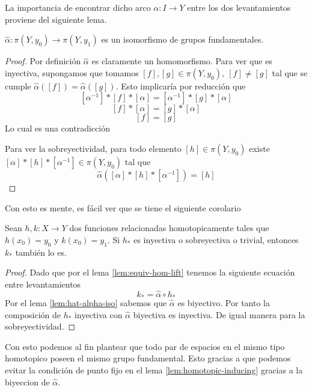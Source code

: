 La importancia de encontrar dicho arco \(\alpha : I \to Y\) entre los
dos levantamientos proviene del siguiente lema.
\begin{lema} \label{lem:hat-alpha-iso}
\(\hat \alpha : \pi (Y, y_0) \to \pi (Y, y_1)\) es un isomorfismo de
grupos fundamentales.
\end{lema}
\begin{proof}
  Por definición \(\hat \alpha\) es claramente un homomorfismo. Para ver
  que es inyectiva, supongamos que tomamos \([f],[g] \in \pi (Y, y_0),\
  [f] \neq [g]\) tal que se cumple \(\hat \alpha ([f]) = \hat \alpha
  ([g])\). Esto implicaría por reducción que
  \[ [\alpha^{-1}] * [f] * [\alpha] = [\alpha^{-1}] * [g] * [\alpha] \]
  \[ [f] * [\alpha] = [g] * [\alpha] \]
  \[ [f] = [g] \]
  Lo cual es una contradicción

  Para ver la sobreyectividad, para todo elemento \([h]
  \in \pi (Y,y_0)\) existe \( [\alpha] * [h] * [\alpha^{-1}] \in \pi
  (Y,y_0)\) tal que
  \[ \hat \alpha ([\alpha] * [h] * [\alpha^{-1}]) = [h]\]
\end{proof}
Con esto es mente, es fácil ver que se tiene el siguiente corolario
\begin{corolario}
  Sean \(h,k : X \to Y\) dos funciones relacionadas homotopicamente
  tales que \(h (x_0) = y_0\) y \(k(x_0) = y_1\). Si \(h_*\) es inyectiva
  o sobreyectiva o trivial, entonces \(k_*\) también lo es.
\end{corolario}
\begin{proof}
  Dado que por el lema \ref{lem:equiv-hom-lift} tenemos la siguiente
  ecuación entre levantamientos
  \[ k_* = \hat \alpha \circ h_* \]
  Por el lema \ref{lem:hat-alpha-iso} sabemos que \(\hat \alpha\) es
  biyectivo. Por tanto la composición de \(h_*\) inyectiva con \(\hat
  \alpha\) biyectiva es inyectiva. De igual manera para la
  sobreyectividad.
\end{proof}
Con esto podemos al fin plantear que todo par de espacios en el mismo
tipo homotopico poseen el mismo grupo fundamental. Esto gracias a que
podemos evitar la condición de punto fijo en el lema
\ref{lem:homotopic-inducing} gracias a la biyeccion de \(\hat \alpha\).

